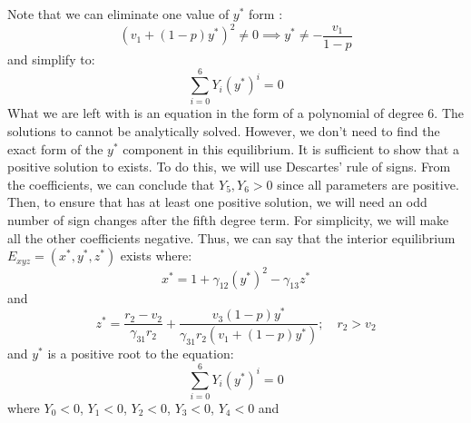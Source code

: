 Note that we can eliminate one value of $y^*$ form :
\[
\left(v_1+\left(1-p\right)y^*\right)^2\neq0 \implies y^*\neq-\frac{v_1}{1-p}
\]
and simplify  to:
\begin{equation}
    \sum_{i=0}^6 Y_i\left(y^*\right)^i=0
    \label{eq:4.25}
\end{equation}
What we are left with is an equation in the form of a polynomial of degree 6. The solutions to  cannot be analytically solved. However, we don't need to find the exact form of the $y^*$ component in this equilibrium. It is sufficient to show that a positive solution to  exists. To do this, we will use Descartes' rule of signs. From the coefficients, we can conclude that $Y_5,Y_6>0$ since all parameters are positive. Then, to ensure that  has at least one positive solution, we will need an odd number of sign changes after the fifth degree term. For simplicity, we will make all the other coefficients negative. Thus, we can say that the interior equilibrium $E_{xyz}=\left(x^*,y^*,z^*\right)$ exists where:
\[
x^*=1+\gamma_{12}\left(y^*\right)^2-\gamma_{13}z^*
\]
and
\[
z^*=\frac{r_2-v_2}{\gamma_{31}r_2}+\frac{v_3\left(1-p\right)y^*}{\gamma_{31}r_2\left(v_1+\left(1-p\right)y^*\right)};\quad r_2>v_2
\]
and $y^*$ is a positive root to the equation:
\begin{equation*}
    \sum_{i=0}^6 Y_i\left(y^*\right)^i=0
\end{equation*}
where $Y_0<0$, $Y_1<0$, $Y_2<0$, $Y_3<0$, $Y_4<0$ and 

